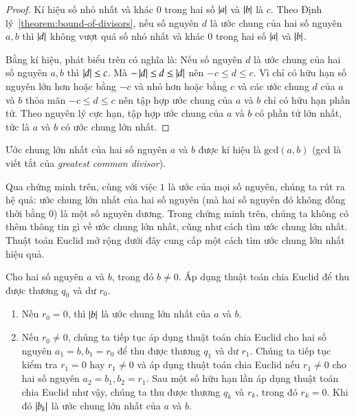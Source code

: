 \begin{proof}
    Kí hiệu số nhỏ nhất và khác $0$ trong hai số $\left\vert{a}\right\vert$ và $\left\vert{b}\right\vert$ là $c$. Theo Định lý~\ref{theorem:bound-of-divisors}, nếu số nguyên $d$ là ước chung của hai số nguyên $a, b$ thì $\left\vert{d}\right\vert$ không vượt quá số nhỏ nhất và khác $0$ trong hai số $\left\vert{a}\right\vert$ và $\left\vert{b}\right\vert$.

    Bằng kí hiệu, phát biểu trên có nghĩa là: Nếu số nguyên $d$ là ước chung của hai số nguyên $a, b$ thì $\left\vert{d}\right\vert\leq c$. Mà $-\left\vert{d}\right\vert\leq d \leq \left\vert{d}\right\vert$ nên $-c\leq d\leq c$. Vì chỉ có hữu hạn số nguyên lớn hơn hoặc bằng $-c$ và nhỏ hơn hoặc bằng $c$ và các ước chung $d$ của $a$ và $b$ thỏa mãn $-c\leq d\leq c$ nên tập hợp ước chung của $a$ và $b$ chỉ có hữu hạn phần tử. Theo nguyên lý cực hạn, tập hợp ước chung của $a$ và $b$ có phần tử lớn nhất, tức là $a$ và $b$ có ước chung lớn nhất.
\end{proof}

Ước chung lớn nhất của hai số nguyên $a$ và $b$ được kí hiệu là $\text{gcd}(a, b)$ (gcd là viết tắt của \textit{greatest common divisor}).

Qua chứng minh trên, cùng với việc $1$ là ước của mọi số nguyên, chúng ta rút ra hệ quả: ước chung lớn nhất của hai số nguyên (mà hai số nguyên đó không đồng thời bằng $0$) là một số nguyên dương. Trong chứng minh trên, chúng ta không có thêm thông tin gì về ước chung lớn nhất, cũng như cách tìm ước chung lớn nhất. Thuật toán Euclid mở rộng dưới đây cung cấp một cách tìm ước chung lớn nhất hiệu quả.

\begin{theorem}
    Cho hai số nguyên $a$ và $b$, trong đó $b\ne 0$. Áp dụng thuật toán chia Euclid để thu được thương $q_{0}$ và dư $r_{0}$.

    \begin{enumerate}[label={(\roman*)}]
        \item Nếu $r_{0} = 0$, thì $\left\vert{b}\right\vert$ là ước chung lớn nhất của $a$ và $b$.
        \item Nếu $r_{0}\ne 0$, chúng ta tiếp tục áp dụng thuật toán chia Euclid cho hai số nguyên $a_{1} = b, b_{1} = r_{0}$ để thu được thương $q_{1}$ và dư $r_{1}$. Chúng ta tiếp tục kiểm tra $r_{1} = 0$ hay $r_{1}\ne 0$ và áp dụng thuật toán chia Euclid nếu $r_{1}\ne 0$ cho hai số nguyên $a_{2} = b_{1}, b_{2} = r_{1}$. Sau một số hữu hạn lần áp dụng thuật toán chia Euclid như vậy, chúng ta thu được thương $q_{k}$ và $r_{k}$, trong đó $r_{k} = 0$. Khi đó $\left\vert{b_{k}}\right\vert$ là ước chung lớn nhất của $a$ và $b$.
    \end{enumerate}
\end{theorem}

